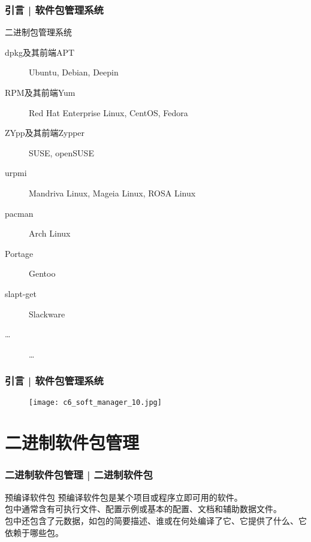 \begin{frame}
  \frametitle{引言 | 软件包管理系统}
  \begin{block}{\alert{二进制包管理系统}}
    \begin{description}
      \item[dpkg及其前端APT] Ubuntu, Debian, Deepin
      \item[RPM及其前端Yum] Red Hat Enterprise Linux, CentOS, Fedora
      \item[ZYpp及其前端Zypper] SUSE, openSUSE
      \item[urpmi] Mandriva Linux, Mageia Linux, ROSA Linux
      \item[pacman] Arch Linux
      \item[Portage] Gentoo
      \item[slapt-get] Slackware
      \item[\ldots] \ldots
    \end{description}
  \end{block}
\end{frame}

\begin{frame}
  \frametitle{引言 | 软件包管理系统}
  \begin{figure}
    \centering
    \texttt{[image: c6\_soft\_manager\_10.jpg]}
  \end{figure}
\end{frame}

\section{二进制软件包管理}
\begin{frame}
  \frametitle{二进制软件包管理 | 二进制软件包}
  \begin{block}{预编译软件包}
    预编译软件包是某个项目或程序立即可用的软件。\\
    包中通常含有可执行文件、配置示例或基本的配置、文档和辅助数据文件。\\
    包中还包含了元数据，如包的简要描述、谁或在何处编译了它、它提供了什么、它依赖于哪些包。
  \end{block}
\end{frame}

